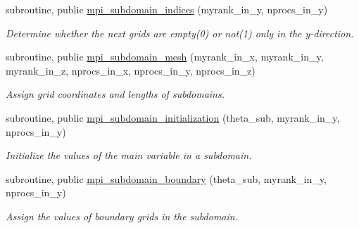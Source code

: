\begin{DoxyCompactItemize}
subroutine, public \mbox{\hyperlink{namespacempi__subdomain_afe948dc18da021f2448cf9a6265155fe}{mpi\+\_\+subdomain\+\_\+indices}} (myrank\+\_\+in\+\_\+y, nprocs\+\_\+in\+\_\+y)
\begin{DoxyCompactList}\small\item\em Determine whether the next grids are empty(0) or not(1) only in the y-\/direction. \end{DoxyCompactList}\item 
subroutine, public \mbox{\hyperlink{namespacempi__subdomain_a612331eead74041f174ece9a572c7427}{mpi\+\_\+subdomain\+\_\+mesh}} (myrank\+\_\+in\+\_\+x, myrank\+\_\+in\+\_\+y, myrank\+\_\+in\+\_\+z, nprocs\+\_\+in\+\_\+x, nprocs\+\_\+in\+\_\+y, nprocs\+\_\+in\+\_\+z)
\begin{DoxyCompactList}\small\item\em Assign grid coordinates and lengths of subdomains. \end{DoxyCompactList}\item 
subroutine, public \mbox{\hyperlink{namespacempi__subdomain_a7cc0deb85b84358eb7addeea849733c4}{mpi\+\_\+subdomain\+\_\+initialization}} (theta\+\_\+sub, myrank\+\_\+in\+\_\+y, nprocs\+\_\+in\+\_\+y)
\begin{DoxyCompactList}\small\item\em Initialize the values of the main variable in a subdomain. \end{DoxyCompactList}\item 
subroutine, public \mbox{\hyperlink{namespacempi__subdomain_a55659431068678c08d21847338390ea8}{mpi\+\_\+subdomain\+\_\+boundary}} (theta\+\_\+sub, myrank\+\_\+in\+\_\+y, nprocs\+\_\+in\+\_\+y)
\begin{DoxyCompactList}\small\item\em Assign the values of boundary grids in the subdomain. \end{DoxyCompactList}\end{DoxyCompactItemize}
